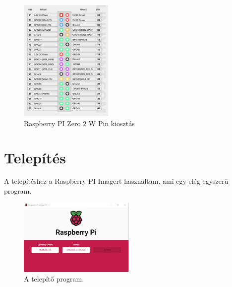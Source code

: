 \documentclass[a4paper,12pt,oneside]{report}
\begin{document}
\begin{itemize}
	\begin{figure}[htbp]
		\centering
		\includegraphics[width=0.4\textwidth]{fig/gpio.png}
		\caption{Raspberry PI Zero 2 W Pin kiosztás}
		\label{fig-gpio}
	\end{figure}
		
	\end{itemize}









\chapter{Telepítés}

A telepítéshez a Raspberry PI Imagert használtam, ami egy elég egyszerű program.

\begin{figure}[htbp]
	\centering
	\includegraphics[width=0.5\textwidth]{fig/Imager.png}
	\caption{A telepítő program.}
	\label{fig-Imager}
\end{figure}
\end{document}
